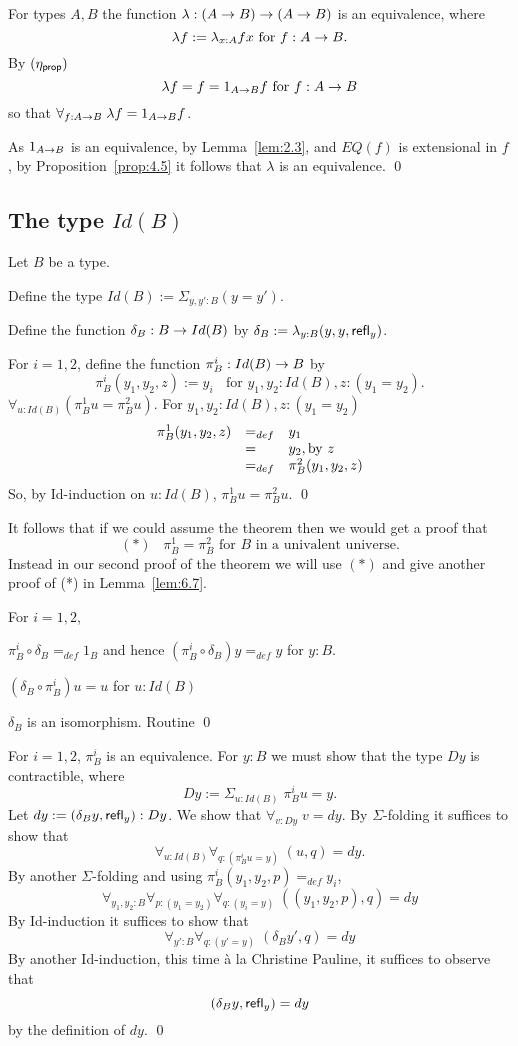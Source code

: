  \label{cor:4.6}
For types $A,B$ the function $\lambda:(A\ra B)\ra(A\ra B)$ is an equivalence, where 
  \[ \lambda f := \lambda_{x:A} fx\mbox{ for } f:A\ra B.\]
\proof By $(\eta_{\sf prop})$
  \[ \lambda f = f = 1_{A\ra B}f\mbox{ for } f:A\ra B\]
so that $\forall_{f:A\ra B}\; \lambda f=1_{A\ra B}f$.

As $1_{A\ra B}$ is an equivalence, by Lemma~\ref{lem:2.3}, and $EQ(f)$ is extensional in $f$, by Proposition~\ref{prop:4.5} it follows that $\lambda$ is an equivalence.
\qed

\subsection{The type $Id(B)$}

 Let $B$ be a type.
\item Define the type $Id(B):=\Sigma_{y,y':B}(y=y')$.
\item Define the function $\delta_B:B\ra Id(B)$ by
$\delta_B:=\lambda_{y:B}(y,y,\refl{y})$.
\item For $i=1,2$, define  the function $\pi^i_B:Id(B)\ra B$ by
  \[ \pi^i_B(y_1,y_2,z):= y_i\;\;\mbox{ for }y_1,y_2:Id(B), z:(y_1=y_2).\]
$\forall_{u:Id(B)}(\pi^1_Bu = \pi^2_Bu)$.
\proof
For $y_1,y_2:Id(B), z:(y_1=y_2)$
  \[\be{array}{lll}
\pi^1_B(y_1,y_2,z)&=_{def}& y_1\\
                 &=&y_2, \mbox{by } z\\
                 &=_{def}&\pi^2_B(y_1,y_2,z)
  \en{array}\]
So, by Id-induction on $u:Id(B)$, $\pi^1_Bu = \pi^2_Bu$.  
\qed

It follows that if we could assume
the theorem then we would get a proof that 
  \[ (*)\;\;\;\pi^1_B = \pi^2_B\mbox{ for $B$ in a univalent universe.}\]  
Instead in our second proof of the theorem we will use $(*)$ 
and give another proof of (*) in Lemma~\ref{lem:6.7}.

\label{fe:lem-delta-equiv} \label{lem:4.9}
For $i=1,2$,
\item $\pi^i_B\circ\delta_B =_{def} 1_B$ and hence 
$(\pi^i_B\circ\delta_B)y =_{def} y$ for $y:B$.
\item $(\delta_B\circ\pi^i_B)u = u$ for $u:Id(B)$
\item $\delta_B$ is an isomorphism.
\proof Routine
\qed


\label{lem:4.10}
For $i=1,2$, $\pi^i_B$ is an equivalence.
\proof For $y:B$ we must show that the type $Dy$ is contractible, where
  \[ Dy := \Sigma_{u:Id(B)}\; \pi^i_Bu=y.\]
Let $dy:=(\delta_By,\refl{y}):Dy$.  We show that $\forall_{v:Dy}\; v=dy$.
By $\Sigma$-folding it suffices to show that
  \[ \forall_{u:Id(B)}\forall_{q:(\pi^i_Bu=y)}\; (u,q)=dy.\]
By another $\Sigma$-folding and using $\pi^i_B(y_1,y_2,p)=_{def}y_i$,
  \[\forall_{y_1,y_2:B}\forall_{p:(y_1=y_2)}\forall_{q:(y_i=y)}
       \;  ((y_1,y_2,p),q)=dy
  \]
By Id-induction it suffices to show that
  \[ \forall_{y':B}\forall_{q:(y'=y)}\; (\delta_By',q)=dy\]
By another Id-induction, this time \`{a} la Christine Pauline, it suffices to observe that
  \[ (\delta_By,\refl{y})=dy\]
by the definition of $dy$.
\qed

